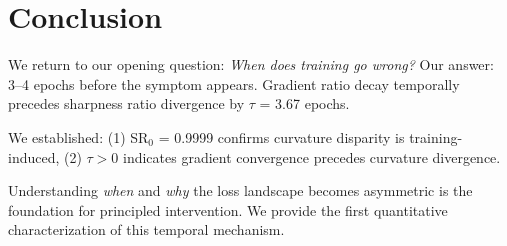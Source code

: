 \section{Conclusion}

We return to our opening question: \emph{When does training go wrong?} Our answer: 3--4 epochs before the symptom appears. Gradient ratio decay temporally precedes sharpness ratio divergence by $\tau$ = 3.67 epochs.

We established: (1) SR$_0$ = 0.9999 confirms curvature disparity is training-induced, (2) $\tau > 0$ indicates gradient convergence precedes curvature divergence.

Understanding \emph{when} and \emph{why} the loss landscape becomes asymmetric is the foundation for principled intervention. We provide the first quantitative characterization of this temporal mechanism.

